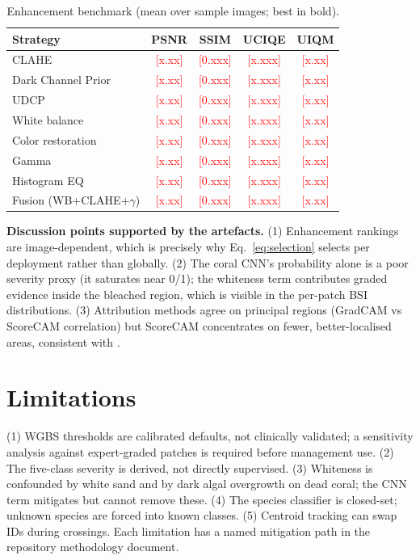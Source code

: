 \documentclass[conference]{IEEEtran}
\newcommand{\tofill}[1]{\textcolor{red}{[#1]}}
\begin{document}
\begin{table}[t]
\centering
\caption{Enhancement benchmark (mean over sample images; best in bold).}
\label{tab:enhancement}
\begin{tabular}{lcccc}
\toprule
Strategy & PSNR & SSIM & UCIQE & UIQM \\
\midrule
CLAHE & \tofill{x.xx} & \tofill{0.xxx} & \tofill{x.xxx} & \tofill{x.xx} \\
Dark Channel Prior & \tofill{x.xx} & \tofill{0.xxx} & \tofill{x.xxx} & \tofill{x.xx} \\
UDCP & \tofill{x.xx} & \tofill{0.xxx} & \tofill{x.xxx} & \tofill{x.xx} \\
White balance & \tofill{x.xx} & \tofill{0.xxx} & \tofill{x.xxx} & \tofill{x.xx} \\
Color restoration & \tofill{x.xx} & \tofill{0.xxx} & \tofill{x.xxx} & \tofill{x.xx} \\
Gamma & \tofill{x.xx} & \tofill{0.xxx} & \tofill{x.xxx} & \tofill{x.xx} \\
Histogram EQ & \tofill{x.xx} & \tofill{0.xxx} & \tofill{x.xxx} & \tofill{x.xx} \\
Fusion (WB+CLAHE+$\gamma$) & \tofill{x.xx} & \tofill{0.xxx} & \tofill{x.xxx} & \tofill{x.xx} \\
\bottomrule
\end{tabular}
\end{table}

\textbf{Discussion points supported by the artefacts.} (1) Enhancement rankings are image-dependent, which is precisely why Eq.~\eqref{eq:selection} selects per deployment rather than globally. (2) The coral CNN's probability alone is a poor severity proxy (it saturates near 0/1); the whiteness term contributes graded evidence inside the bleached region, which is visible in the per-patch BSI distributions. (3) Attribution methods agree on principal regions (GradCAM vs ScoreCAM correlation) but ScoreCAM concentrates on fewer, better-localised areas, consistent with \cite{wang2020scorecam}.

\section{Limitations}
\label{sec:limits}
(1) WGBS thresholds are calibrated defaults, not clinically validated; a sensitivity analysis against expert-graded patches is required before management use. (2) The five-class severity is derived, not directly supervised. (3) Whiteness is confounded by white sand and by dark algal overgrowth on dead coral; the CNN term mitigates but cannot remove these. (4) The species classifier is closed-set; unknown species are forced into known classes. (5) Centroid tracking can swap IDs during crossings. Each limitation has a named mitigation path in the repository methodology document.
\end{document}
